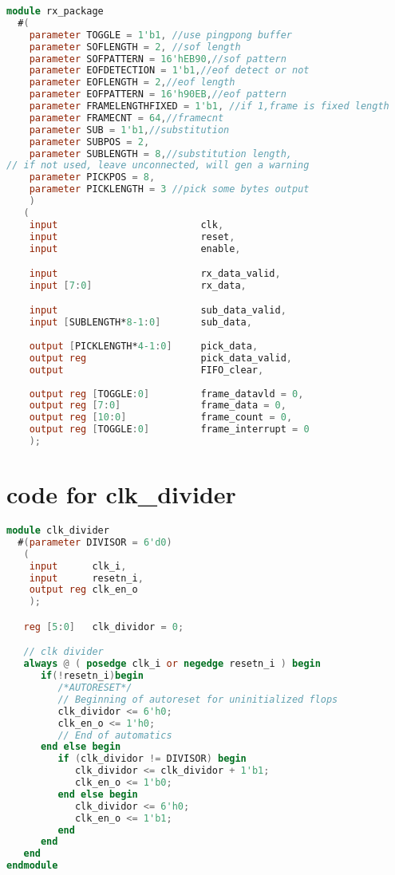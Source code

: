 \documentclass{article}
\begin{document}
\begin{lstlisting}[language=Verilog]
module rx_package
  #(
    parameter TOGGLE = 1'b1, //use pingpong buffer    
    parameter SOFLENGTH = 2, //sof length
    parameter SOFPATTERN = 16'hEB90,//sof pattern
    parameter EOFDETECTION = 1'b1,//eof detect or not
    parameter EOFLENGTH = 2,//eof length
    parameter EOFPATTERN = 16'h90EB,//eof pattern
    parameter FRAMELENGTHFIXED = 1'b1, //if 1,frame is fixed length
    parameter FRAMECNT = 64,//framecnt
    parameter SUB = 1'b1,//substitution
    parameter SUBPOS = 2,
    parameter SUBLENGTH = 8,//substitution length,
// if not used, leave unconnected, will gen a warning   
    parameter PICKPOS = 8,
    parameter PICKLENGTH = 3 //pick some bytes output
    )
   (
    input                         clk,
    input                         reset,
    input                         enable,

    input                         rx_data_valid,
    input [7:0]                   rx_data, 

    input                         sub_data_valid, 
    input [SUBLENGTH*8-1:0]       sub_data,
   
    output [PICKLENGTH*4-1:0]     pick_data,
    output reg                    pick_data_valid,
    output                        FIFO_clear,
   
    output reg [TOGGLE:0]         frame_datavld = 0, 
    output reg [7:0]              frame_data = 0,
    output reg [10:0]             frame_count = 0, 
    output reg [TOGGLE:0]         frame_interrupt = 0
    );
\end{lstlisting}





\section{code for clk\_divider}
\begin{lstlisting}[language=Verilog]
module clk_divider
  #(parameter DIVISOR = 6'd0)   
   (
    input      clk_i,
    input      resetn_i,
    output reg clk_en_o
    );

   reg [5:0]   clk_dividor = 0;   

   // clk divider
   always @ ( posedge clk_i or negedge resetn_i ) begin
      if(!resetn_i)begin
         /*AUTORESET*/
         // Beginning of autoreset for uninitialized flops
         clk_dividor <= 6'h0;
         clk_en_o <= 1'h0;
         // End of automatics
      end else begin
         if (clk_dividor != DIVISOR) begin
            clk_dividor <= clk_dividor + 1'b1;
            clk_en_o <= 1'b0;
         end else begin
            clk_dividor <= 6'h0;
            clk_en_o <= 1'b1;
         end
      end      
   end
endmodule
\end{lstlisting}
\end{document}
